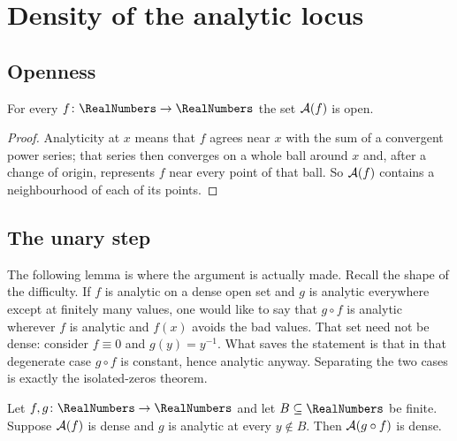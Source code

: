 \section{Density of the analytic locus}\label{ne:sec:density}

\subsection{Openness}

\begin{lemma}\label{ne:lem:open}
For every $f\colon\RealNumbers\to\RealNumbers$ the set $\mathcal A(f)$ is open.
\end{lemma}

\begin{proof}
Analyticity at $x$ means that $f$ agrees near $x$ with the sum of a
convergent power series; that series then converges on a whole ball around
$x$ and, after a change of origin, represents $f$ near every point of that
ball.  So $\mathcal A(f)$ contains a neighbourhood of each of its points.
\end{proof}

\subsection{The unary step}

The following lemma is where the argument is actually made.  Recall the shape
of the difficulty.  If $f$ is analytic on a dense open set and $g$ is analytic
everywhere except at finitely many values, one would like to say that
$g\circ f$ is analytic wherever $f$ is analytic and $f(x)$ avoids the bad
values.  That set need not be dense: consider $f\equiv 0$ and $g(y)=y^{-1}$.
What saves the statement is that in that degenerate case $g\circ f$ is
constant, hence analytic anyway.  Separating the two cases is exactly the
isolated-zeros theorem.

\begin{lemma}\label{ne:lem:key}
Let $f,g\colon\RealNumbers\to\RealNumbers$ and let $B\subseteq\RealNumbers$ be finite.  Suppose $\mathcal A(f)$ is
dense and $g$ is analytic at every $y\notin B$.  Then $\mathcal A(g\circ f)$ is
dense.
\end{lemma}

